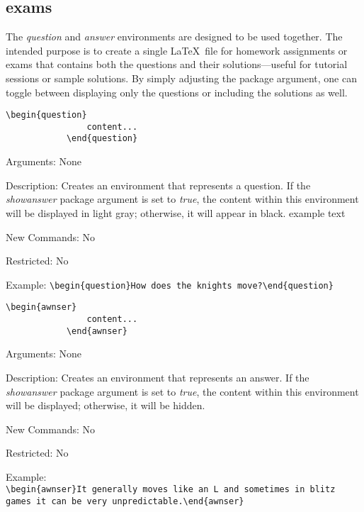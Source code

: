 \documentclass[10pt, a4paper]{article}
\newenvironment{itemizeexamplecommand}{
	\begin{itemize}
		\setlength\itemsep{-0.2em}
	}
	{
	\end{itemize}
}
\begin{document}
	\subsection{exams}
	The \textit{question} and \textit{answer} environments are designed to be used together. The intended purpose is to create a single \LaTeX\ file for homework assignments or exams that contains both the questions and their solutions—useful for tutorial sessions or sample solutions. By simply adjusting the package argument, one can toggle between displaying only the questions or including the solutions as well.
	\pex\begin{itemizeexamplecommand}
			\item[] \begin{lstlisting}[style=B]
			\begin{question}
				content...
			\end{question}
			\end{lstlisting}
			{\scriptsize
				\item[] Arguments: None
				\item[] Description: Creates an environment that represents a question. If the \textit{showanswer} package argument is set to \textit{true}, the content within this environment will be displayed in light gray; otherwise, it will appear in black. \color{fglquestioncolor}example text\color{black}\ 
				\item[] New Commands: No
				\item[] Restricted: No
				\item[] Example: \verb=\begin{question}How does the knights move?\end{question}=}
		\end{itemizeexamplecommand}
	\xe
	\pex\begin{itemizeexamplecommand}
			\item[] \begin{lstlisting}[style=B]
			\begin{awnser}
				content...
			\end{awnser}
			\end{lstlisting}
			{\scriptsize
				\item[] Arguments: None
				\item[] Description: Creates an environment that represents an answer. If the \textit{showanswer} package argument is set to \textit{true}, the content within this environment will be displayed; otherwise, it will be hidden.
				\item[] New Commands: No
				\item[] Restricted: No
				\item[] Example: \\\verb=\begin{awnser}It generally moves like an L and sometimes in blitz games it can be very unpredictable.\end{awnser}=}
		\end{itemizeexamplecommand}
	\xe
\end{document}
